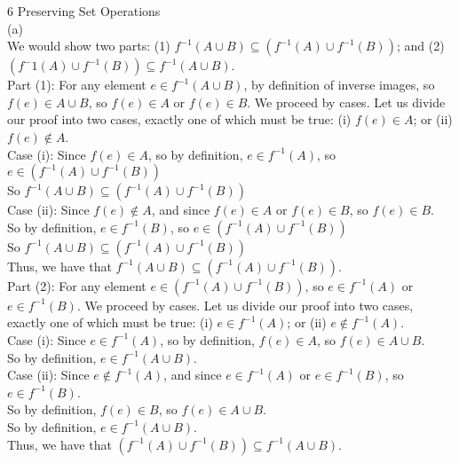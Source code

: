 \documentclass{article}
\begin{document}
{\Large 6 Preserving Set Operations} \\[.3cm]
(a) \\[.15cm]
\indent We would show two parts: (1) $f^{-1}(A\cup B)\subseteq(f^{-1}(A)\cup f^{-1}(B))$; and (2) $(f^-1(A)\cup f^{-1}(B))\subseteq f^{-1}(A\cup B)$.\\[.1cm]
\indent Part (1): For any element $e\in f^{-1}(A\cup B)$, by definition of inverse images, so $f(e)\in A\cup B$, so $f(e)\in A$ or $f(e)\in B$. We proceed by cases. Let us divide our proof into two cases, exactly one of which must be true: (i) $f(e)\in A$; or (ii) $f(e)\notin A$.\\[.1cm]
\indent\indent Case (i): Since $f(e)\in A$, so by definition, $e\in f^{-1}(A)$, so $e\in (f^{-1}(A)\cup f^{-1}(B))$\\[.1cm]
\indent\indent\indent So $f^{-1}(A\cup B)\subseteq(f^{-1}(A)\cup f^{-1}(B))$\\[.1cm]
\indent\indent Case (ii): Since $f(e)\notin A$, and since $f(e)\in A$ or $f(e)\in B$, so $f(e)\in B$.\\[.1cm]
\indent\indent\indent So by definition, $e\in f^{-1}(B)$, so $e\in (f^{-1}(A)\cup f^{-1}(B))$\\[.1cm]
\indent\indent\indent So $f^{-1}(A\cup B)\subseteq(f^{-1}(A)\cup f^{-1}(B))$\\[.1cm]
\indent Thus, we have that $f^{-1}(A\cup B)\subseteq(f^{-1}(A)\cup f^{-1}(B)).$\\[.15cm]
\indent Part (2): For any element $e\in (f^{-1}(A)\cup f^{-1}(B))$, so $e\in f^{-1}(A)$ or $e\in f^{-1}(B)$. We proceed by cases. Let us divide our proof into two cases, exactly one of which must be true: (i) $e\in f^{-1}(A)$; or (ii) $e\notin f^{-1}(A)$.\\[.1cm]
\indent\indent Case (i): Since $e\in f^{-1}(A)$, so by definition, $f(e)\in A$, so $f(e)\in A\cup B$.\\[.1cm]
\indent\indent\indent So by definition, $e\in f^{-1}(A\cup B)$.\\[.1cm]
\indent\indent Case (ii): Since $e\notin f^{-1}(A)$, and since $e\in f^{-1}(A)$ or $e\in f^{-1}(B)$, so $e\in f^{-1}(B)$.\\[.1cm]
\indent\indent\indent So by definition, $f(e)\in B$, so $f(e)\in A\cup B$.\\[.1cm]
\indent\indent\indent So by definition, $e\in f^{-1}(A\cup B)$.\\[.1cm]
\indent Thus, we have that $(f^{-1}(A)\cup f^{-1}(B))\subseteq f^{-1}(A\cup B)$.\\[.15cm]
\end{document}
